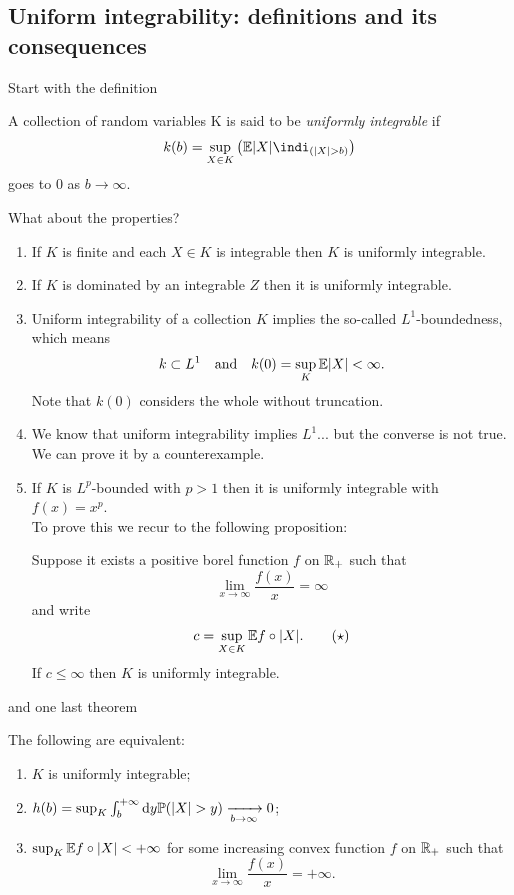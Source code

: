 \documentclass{report}
\begin{document}
\subsection{Uniform integrability: definitions and its consequences}
Start with the definition
\begin{definition}
	A collection of random variables K is said to be \emph{uniformly integrable} if
	\[k(b)=\sup_{X\in K}\left(\ev|X|\indi_{(|X|>b)}\right)\]
	goes to 0 as $b\to\infty$. 
\end{definition}
What about the properties?
	\begin{enumerate}[\circnum]
		\item If $K$ is finite and each $X\in K$ is integrable then $K$ is uniformly integrable.
		\item If $K$ is dominated by an integrable \rv{} $Z$ then it is uniformly integrable.
		\item Uniform integrability of a collection $K$ implies the so-called $L^{1}$-boundedness, which means
		\[k\subset L^{1}\quad\text{and}\quad k(0)=\sup_{K}\mathbb{E} |X|<\infty.\]
		Note that $k(0)$ considers the whole \rv{} without truncation.
		\item We know that uniform integrability implies $L^{1}$... but the converse is not true. We can prove it by a counterexample.
		\item If $K$ is $L^{p}$-bounded with $p>1$ then it is uniformly integrable with $f(x)=x^p$. \\
		To prove this we recur to the following proposition:
		\begin{proposition}
			Suppose it exists a positive borel function $f$ on $\mathbb{R}_+$ such that
			\[\lim_{x\to\infty}\frac{f(x)}{x}=\infty\]
			and write 
			\begin{equation}
				c=\sup_{X\in K}\mathbb{E} f\circ|X|. \tag{$\star$} \label{desiderolamorte}
			\end{equation}
			If $c\leq \infty$ then $K$ is uniformly integrable.
		\end{proposition}
	\end{enumerate}
and one last theorem
\begin{theorem}
	The following are equivalent:
	\begin{enumerate}[\circnum]
		\item $K$ is uniformly integrable;
		\item $h(b)=\sup_{K}\int_{b}^{+\infty}\dy \pr(|X|>y)\xrightarrow[b\to\infty]{}0$;
		\item $\sup_{K}\mathbb{E} f\circ |X|<+\infty$ for some increasing convex function $f$ on $\mathbb{R}_+$ such that
		\[\lim_{x\to\infty}\frac{f(x)}{x}=+\infty.\]
	\end{enumerate}
\end{theorem}
\end{document}
